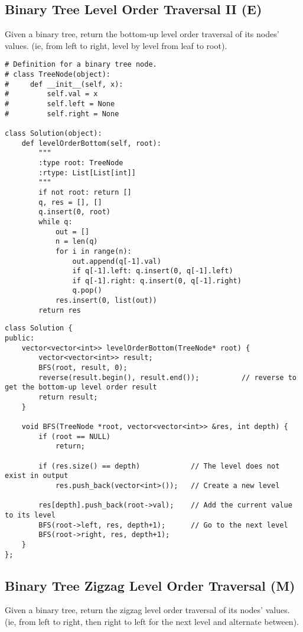 \subsection{Binary Tree Level Order Traversal II (E)}
Given a binary tree, return the bottom-up level order traversal of its nodes' values. (ie, from left to right, level by level from leaf to root).\\

\begin{lstlisting}
# Definition for a binary tree node.
# class TreeNode(object):
#     def __init__(self, x):
#         self.val = x
#         self.left = None
#         self.right = None

class Solution(object):
    def levelOrderBottom(self, root):
        """
        :type root: TreeNode
        :rtype: List[List[int]]
        """
        if not root: return []
        q, res = [], []
        q.insert(0, root)
        while q:
            out = []
            n = len(q)
            for i in range(n):
                out.append(q[-1].val)
                if q[-1].left: q.insert(0, q[-1].left)
                if q[-1].right: q.insert(0, q[-1].right)
                q.pop()
            res.insert(0, list(out))
        return res
\end{lstlisting}

\begin{lstlisting}
class Solution {
public:
    vector<vector<int>> levelOrderBottom(TreeNode* root) {
        vector<vector<int>> result;
        BFS(root, result, 0);
        reverse(result.begin(), result.end());          // reverse to get the bottom-up level order result
        return result;
    }
    
    void BFS(TreeNode *root, vector<vector<int>> &res, int depth) {
        if (root == NULL)
            return;
        
        if (res.size() == depth)            // The level does not exist in output
            res.push_back(vector<int>());   // Create a new level
            
        res[depth].push_back(root->val);    // Add the current value to its level
        BFS(root->left, res, depth+1);      // Go to the next level
        BFS(root->right, res, depth+1);
    }
};
\end{lstlisting}


\subsection{Binary Tree Zigzag Level Order Traversal (M)}
Given a binary tree, return the zigzag level order traversal of its nodes' values. (ie, from left to right, then right to left for the next level and alternate between).\\

